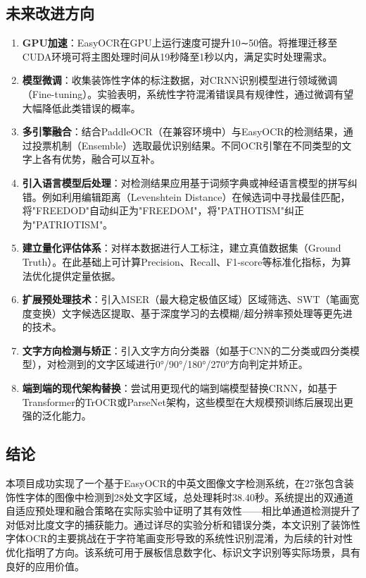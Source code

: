 \documentclass[12pt,hyperref,a4paper,UTF8]{ctexart}
\begin{document}
\subsection{未来改进方向}

\begin{enumerate}
    \item \textbf{GPU加速}：EasyOCR在GPU上运行速度可提升10∼50倍。将推理迁移至CUDA环境可将主图处理时间从19秒降至1秒以内，满足实时处理需求。
    \item \textbf{模型微调}：收集装饰性字体的标注数据，对CRNN识别模型进行领域微调（Fine-tuning）。实验表明，系统性字符混淆错误具有规律性，通过微调有望大幅降低此类错误的概率。
    \item \textbf{多引擎融合}：结合PaddleOCR（在兼容环境中）与EasyOCR的检测结果，通过投票机制（Ensemble）选取最优识别结果。不同OCR引擎在不同类型的文字上各有优势，融合可以互补。
    \item \textbf{引入语言模型后处理}：对检测结果应用基于词频字典或神经语言模型的拼写纠错。例如利用编辑距离（Levenshtein Distance）在候选词中寻找最佳匹配，将"FREEDOD"自动纠正为"FREEDOM"，将"PATHOTISM"纠正为"PATRIOTISM"。
    \item \textbf{建立量化评估体系}：对样本数据进行人工标注，建立真值数据集（Ground Truth）。在此基础上可计算Precision、Recall、F1-score等标准化指标，为算法优化提供定量依据。
    \item \textbf{扩展预处理技术}：引入MSER（最大稳定极值区域）区域筛选、SWT（笔画宽度变换）文字候选区提取、基于深度学习的去模糊/超分辨率预处理等更先进的技术。
    \item \textbf{文字方向检测与矫正}：引入文字方向分类器（如基于CNN的二分类或四分类模型），对检测到的文字区域进行0°/90°/180°/270°方向判定并矫正。
    \item \textbf{端到端的现代架构替换}：尝试用更现代的端到端模型替换CRNN，如基于Transformer的TrOCR或ParseNet架构，这些模型在大规模预训练后展现出更强的泛化能力。
\end{enumerate}

\subsection{结论}

本项目成功实现了一个基于EasyOCR的中英文图像文字检测系统，在27张包含装饰性字体的图像中检测到28处文字区域，总处理耗时38.40秒。系统提出的双通道自适应预处理和融合策略在实际实验中证明了其有效性——相比单通道检测提升了对低对比度文字的捕获能力。通过详尽的实验分析和错误分类，本文识别了装饰性字体OCR的主要挑战在于字符笔画变形导致的系统性识别混淆，为后续的针对性优化指明了方向。该系统可用于展板信息数字化、标识文字识别等实际场景，具有良好的应用价值。
\end{document}
